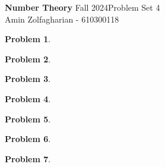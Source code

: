\documentclass[12pt]{article}
\newcommand{\customanswer}[1]{%
\begin{problem}
\end{problem}

}
\newtheorem{problem}{Problem}
\begin{document}
\noindent \textbf{Number Theory} Fall 2024\hfill Problem Set 4\\
Amin Zolfagharian - 610300118

\hrulefill

\customanswer{1}
\customanswer{2}
\customanswer{3}
\customanswer{4}
\customanswer{5}
\customanswer{6}
\customanswer{7}
\end{document}
